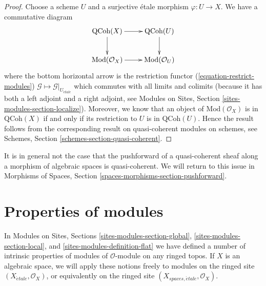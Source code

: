 \begin{proof}
Choose a scheme $U$ and a surjective \'etale morphism $\varphi : U \to X$.
We have a commutative diagram
$$
\xymatrix{
\text{QCoh}(X) \ar[r] \ar[d] & \text{QCoh}(U) \ar[d] \\
\text{Mod}(\mathcal{O}_X) \ar[r] & \text{Mod}(\mathcal{O}_U)
}
$$
where the bottom horizontal arrow is the restriction functor
(\ref{equation-restrict-modules})
$\mathcal{G} \mapsto \mathcal{G}|_{U_{\acute{e}tale}}$ which commutes
with all limits and colimits (because it has both a left adjoint and
a right adjoint, see
Modules on Sites, Section \ref{sites-modules-section-localize}).
Moreover, we know that an object of $\text{Mod}(\mathcal{O}_X)$ is in
$\text{QCoh}(X)$ if and only if its restriction to $U$ is in
$\text{QCoh}(U)$. Hence the result follows from the corresponding
result on quasi-coherent modules on schemes, see
Schemes, Section \ref{schemes-section-quasi-coherent}.
\end{proof}

\noindent
It is in general not the case that the pushforward of a quasi-coherent sheaf
along a morphism of algebraic spaces is quasi-coherent. We will return to this
issue in
Morphisms of Spaces, Section \ref{spaces-morphisms-section-pushforward}.




\section{Properties of modules}
\label{section-properties-modules}

\noindent
In
Modules on Sites, Sections \ref{sites-modules-section-global},
\ref{sites-modules-section-local}, and
\ref{sites-modules-definition-flat}
we have defined a number of intrinsic properties of modules of
$\mathcal{O}$-module on any ringed topos. If $X$ is an algebraic
space, we will apply these notions freely to modules on the ringed
site $(X_{\acute{e}tale}, \mathcal{O}_X)$, or equivalently on the ringed site
$(X_{spaces, \acute{e}tale}, \mathcal{O}_X)$.

